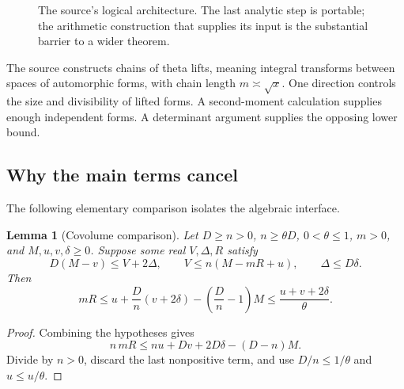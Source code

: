 \documentclass[11pt,letterpaper]{article}
\newtheorem{lemma}[theorem]{Lemma}
\theoremstyle{definition}
\theoremstyle{remark}
\newcommand{\Rea}{\operatorname{Re}}
\begin{document}
\begin{figure}[ht]
\centering
{}
\caption{The source's logical architecture. The last analytic step is
portable; the arithmetic construction that supplies its input is the
substantial barrier to a wider theorem.}
\end{figure}

The source constructs chains of theta lifts, meaning integral transforms
between spaces of automorphic forms, with chain length
\(m\asymp\sqrt{x}\). One direction controls the size and divisibility of
lifted forms. A second-moment calculation supplies enough independent
forms. A determinant argument supplies the opposing lower bound.

\subsection{Why the main terms cancel}

The following elementary comparison isolates the algebraic interface.

\begin{lemma}[Covolume comparison]\label{lem:comparison}
Let \(D\ge n>0\), \(n\ge\theta D\), \(0<\theta\le1\), \(m>0\), and
\(M,u,v,\delta\ge0\). Suppose some real \(V,\Delta,R\) satisfy
\[
 D(M-v)\le V+2\Delta,\qquad
 V\le n(M-mR+u),\qquad \Delta\le D\delta.
\]
Then
\begin{equation}\label{eq:comparison}
 mR\le u+\frac Dn(v+2\delta)
       -\left(\frac Dn-1\right)M
 \le\frac{u+v+2\delta}{\theta}.
\end{equation}
\end{lemma}
\begin{proof}
Combining the hypotheses gives
\[
 n\,mR\le n u+Dv+2D\delta-(D-n)M.
\]
Divide by \(n>0\), discard the last nonpositive term, and use
\(D/n\le1/\theta\) and \(u\le u/\theta\).
\end{proof}
\end{document}
